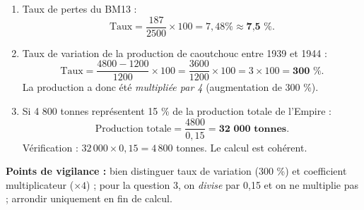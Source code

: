 \documentclass[11pt]{article}
\begin{document}
\begin{corrige}
\begin{enumerate}
\item Taux de pertes du BM13 :
\[ \text{Taux} = \frac{187}{2500} \times 100 = 7{,}48 \% \approx \textbf{7{,}5 \%}. \]
\item Taux de variation de la production de caoutchouc entre 1939 et 1944 :
\[ \text{Taux} = \frac{4800 - 1200}{1200} \times 100 = \frac{3600}{1200} \times 100 = 3 \times 100 = \textbf{300 \%}. \]
La production a donc été \emph{multipliée par 4} (augmentation de 300 \%).
\item Si 4 800 tonnes représentent 15 \% de la production totale de l'Empire :
\[ \text{Production totale} = \frac{4800}{0{,}15} = \textbf{32 000 tonnes}. \]
Vérification : $32\,000 \times 0{,}15 = 4\,800$ tonnes. Le calcul est cohérent.
\end{enumerate}
\textbf{Points de vigilance :} bien distinguer taux de variation (300 \%) et coefficient multiplicateur ($\times 4$) ; pour la question 3, on \emph{divise} par 0,15 et on ne multiplie pas ; arrondir uniquement en fin de calcul.
\end{corrige}
\end{document}
